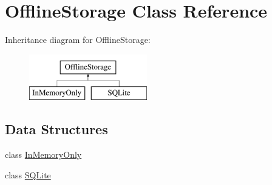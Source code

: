 \hypertarget{class_d_jabberd_1_1_delivery_1_1_offline_storage}{
\section{\-Offline\-Storage \-Class \-Reference}
\label{class_d_jabberd_1_1_delivery_1_1_offline_storage}
}
\-Inheritance diagram for \-Offline\-Storage\-:\begin{figure}[H]
\begin{center}
\leavevmode
\includegraphics[height=2.000000cm]{class_d_jabberd_1_1_delivery_1_1_offline_storage}
\end{center}
\end{figure}
\subsection*{\-Data \-Structures}
\begin{DoxyCompactItemize}
\item 
class \hyperlink{class_d_jabberd_1_1_delivery_1_1_offline_storage_1_1_in_memory_only}{\-In\-Memory\-Only}
\item 
class \hyperlink{class_d_jabberd_1_1_delivery_1_1_offline_storage_1_1_s_q_lite}{\-S\-Q\-Lite}
\end{DoxyCompactItemize}
